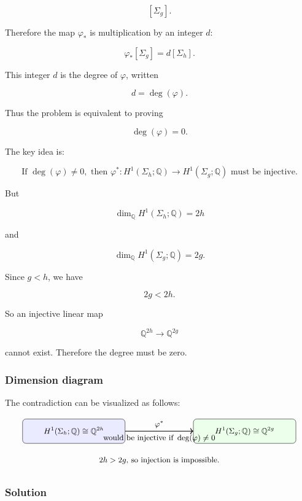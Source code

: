 \documentclass[12pt,a4paper]{article}
\theoremstyle{notespace}
\begin{document}
\[
[\Sigma_g].
\]

Therefore the map \(\varphi_*\) is multiplication by an integer \(d\):

\[
\varphi_*[\Sigma_g]=d[\Sigma_h].
\]

This integer \(d\) is the degree of \(\varphi\), written

\[
d=\deg(\varphi).
\]

Thus the problem is equivalent to proving

\[
\deg(\varphi)=0.
\]

The key idea is:

\[
\boxed{
	\text{If }\deg(\varphi)\neq 0,\text{ then }\varphi^*:H^1(\Sigma_h;\mathbb Q)\to H^1(\Sigma_g;\mathbb Q)
	\text{ must be injective.}
}
\]

But

\[
\dim_{\mathbb Q}H^1(\Sigma_h;\mathbb Q)=2h
\]

and

\[
\dim_{\mathbb Q}H^1(\Sigma_g;\mathbb Q)=2g.
\]

Since \(g<h\), we have

\[
2g<2h.
\]

So an injective linear map

\[
\mathbb Q^{2h}\longrightarrow \mathbb Q^{2g}
\]

cannot exist. Therefore the degree must be zero.

\subsubsection*{Dimension diagram}

The contradiction can be visualized as follows:

\[
\begin{tikzpicture}[scale=1.0, every node/.style={font=\small}]
	\node[draw, rounded corners, fill=blue!8, minimum width=4.2cm, minimum height=1cm] (A) at (0,0)
	{\(H^1(\Sigma_h;\mathbb Q)\cong \mathbb Q^{2h}\)};
	
	\node[draw, rounded corners, fill=green!8, minimum width=4.2cm, minimum height=1cm] (B) at (7,0)
	{\(H^1(\Sigma_g;\mathbb Q)\cong \mathbb Q^{2g}\)};
	
	\draw[->, thick] (A) -- node[above] {\(\varphi^*\)} node[below] {\(\text{would be injective if }\deg(\varphi)\neq 0\)} (B);
	
	\node at (3.5,-1.2) {\(2h>2g\), so injection is impossible.};
\end{tikzpicture}
\]

\subsubsection*{Solution}
\end{document}
